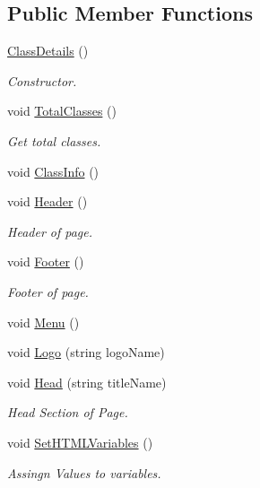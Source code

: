 \subsection*{Public Member Functions}
\begin{DoxyCompactItemize}
\item 
\hyperlink{classClassDetails_af8fb7a92c63d62a03a60c47476f4523a}{Class\-Details} ()
\begin{DoxyCompactList}\small\item\em Constructor. \end{DoxyCompactList}\item 
void \hyperlink{classClassDetails_a2a63d68979d3ac96d35e6534414799ef}{Total\-Classes} ()
\begin{DoxyCompactList}\small\item\em Get total classes. \end{DoxyCompactList}\item 
void \hyperlink{classClassDetails_a7eed324cd736c68fe4b420de481e3b17}{Class\-Info} ()
\item 
void \hyperlink{classClassDetails_a4a0b14f8c5ca7f845d64854a0d81e1ec}{Header} ()
\begin{DoxyCompactList}\small\item\em Header of page. \end{DoxyCompactList}\item 
void \hyperlink{classClassDetails_a8e80a53e9b6597171c6d8b1976dc33f9}{Footer} ()
\begin{DoxyCompactList}\small\item\em Footer of page. \end{DoxyCompactList}\item 
void \hyperlink{classPageLayout_a49af1dca286bbee9432192a7b3c00332}{Menu} ()
\item 
void \hyperlink{classPageLayout_ae60235c6af48e3ebbc6343d02456da0c}{Logo} (string logo\-Name)
\item 
void \hyperlink{classPageLayout_ae50907d56f0ba7a85f7ccfdeafa45bcc}{Head} (string title\-Name)
\begin{DoxyCompactList}\small\item\em Head Section of Page. \end{DoxyCompactList}\item 
void \hyperlink{classHTMLTags_abe32ec84b6b2940afbc993be2db178e9}{Set\-H\-T\-M\-L\-Variables} ()
\begin{DoxyCompactList}\small\item\em Assingn Values to variables. \end{DoxyCompactList}\item 

\end{DoxyCompactItemize}
